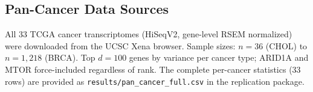 \documentclass[sigconf,review]{acmart}
\begin{document}
\subsection{Pan-Cancer Data Sources}
All 33 TCGA cancer transcriptomes (HiSeqV2, gene-level RSEM normalized) were downloaded from the UCSC Xena browser. Sample sizes: $n=36$ (CHOL) to $n=1{,}218$ (BRCA). Top $d=100$ genes by variance per cancer type; ARID1A and MTOR force-included regardless of rank. The complete per-cancer statistics (33 rows) are provided as \texttt{results/pan\_cancer\_full.csv} in the replication package.
\end{document}
